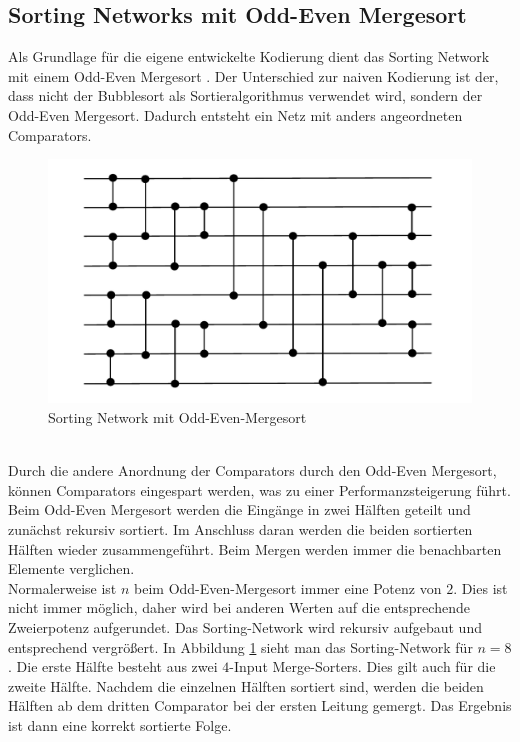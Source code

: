 \documentclass[a4,abstract=on]{scrartcl}
\begin{document}
	\subsection{Sorting Networks mit Odd-Even Mergesort}
Als Grundlage für die eigene entwickelte Kodierung dient das Sorting Network mit einem Odd-Even Mergesort \cite[vgl.][]{odd-even}. Der Unterschied zur naiven Kodierung ist der, dass nicht der Bubblesort als Sortieralgorithmus verwendet wird, sondern der Odd-Even Mergesort. Dadurch entsteht ein Netz mit anders angeordneten Comparators.

\begin{figure}[H]
\centering
\includegraphics[width=\textwidth]{sorting_network_odd_even.pdf}
\caption{Sorting Network mit Odd-Even-Mergesort}
\label{fig:odd-even-mergesort}
\end{figure}
\ \\
Durch die andere Anordnung der Comparators durch den Odd-Even Mergesort, können Comparators eingespart werden, was zu einer Performanzsteigerung führt. Beim Odd-Even Mergesort werden die Eingänge in zwei Hälften geteilt und zunächst rekursiv sortiert. Im Anschluss daran werden die beiden sortierten Hälften wieder zusammengeführt. Beim Mergen werden immer die benachbarten Elemente verglichen.\\
Normalerweise ist $n$ beim Odd-Even-Mergesort immer eine Potenz von $2$. Dies ist nicht immer möglich, daher wird bei anderen Werten auf die entsprechende Zweierpotenz aufgerundet. Das Sorting-Network wird rekursiv aufgebaut und entsprechend vergrößert. In Abbildung \ref{fig:odd-even-mergesort} sieht man das Sorting-Network für $n=8$. Die erste Hälfte besteht aus zwei $4$-Input Merge-Sorters. Dies gilt auch für die zweite Hälfte. Nachdem die einzelnen Hälften sortiert sind, werden die beiden Hälften ab dem dritten Comparator bei der ersten Leitung gemergt. Das Ergebnis ist dann eine korrekt sortierte Folge.
\end{document}
